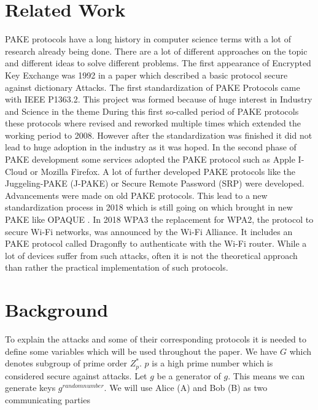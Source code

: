 \documentclass[journal]{IEEEtran}
\begin{document}
\section{Related Work}
PAKE protocols have a long history in computer science terms with a lot of research already being done.
There are a lot of different approaches on the topic and different ideas to solve different problems. \cite{hao2022sok}
The first appearance of Encrypted Key Exchange was 1992 in a paper which described a basic protocol secure against dictionary Attacks. \cite{bellovin1992encrypted}
The first standardization of PAKE Protocols came with IEEE P1363.2. This project was formed because of huge interest in Industry and Science in the theme
During this first so-called period of PAKE protocols these protocols where revised and reworked multiple times which extended the working period to 2008.
However after the standardization was finished it did not lead to huge adoption in the industry as it was hoped. \cite{hao2022sok}
In the second phase of PAKE development some services adopted the PAKE protocol such as Apple I-Cloud or Mozilla Firefox. \cite{de2021parasite}
A lot of further developed PAKE protocols like the Juggeling-PAKE (J-PAKE) \cite{hao2008password} or Secure Remote Password (SRP) \cite{toorani2014security}  were developed. Advancements were made on old PAKE protocols.
This lead to a new standardization process in 2018 \cite{hao2022sok} which is still going on which brought in new PAKE like OPAQUE \cite{jarecki2018opaque}.
In 2018 WPA3 the replacement for WPA2, the protocol to secure Wi-Fi networks, was announced by the Wi-Fi Alliance. \cite{vanhoef2020dragonblood}
It includes an PAKE protocol called Dragonfly to authenticate with the Wi-Fi router. 
While a lot of devices suffer from such attacks, often it is not the theoretical approach than rather the practical implementation of such protocols.

\section{Background}
To explain the attacks and some of their corresponding protocols it is needed to define some variables which will be used throughout the paper.
We have $G$ which denotes subgroup of prime order $Z^{*}_{p}$.
$p$ is a high prime number which is considered secure against attacks.
Let $g$ be a generator of $g$. This means we can generate keys $g^{random number}$.
We will use Alice (A) and Bob (B) as two communicating parties  
\end{document}

